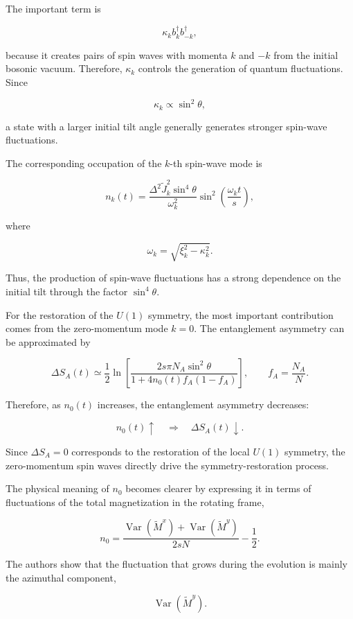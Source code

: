 \documentclass[10pt,a4paper,twocolumn]{article}
\begin{document}
		The important term is
		
		$$
		\kappa_k b_k^\dagger b_{-k}^\dagger,
		$$
		
		because it creates pairs of spin waves with momenta \(k\) and \(-k\) from the initial bosonic vacuum. Therefore, \(\kappa_k\) controls the generation of quantum fluctuations. Since
		
		$$
		\kappa_k\propto\sin^2\theta,
		$$
		
		a state with a larger initial tilt angle generally generates stronger spin-wave fluctuations. 
		
		The corresponding occupation of the \(k\)-th spin-wave mode is
		
		$$
		n_k(t)
		=
		\frac{\Delta^2\tilde J_k^2\sin^4\theta}{\omega_k^2}
		\sin^2\left(\frac{\omega_k t}{s}\right),
		$$
		
		where
		
		$$
		\omega_k=\sqrt{\xi_k^2-\kappa_k^2}.
		$$
		
		Thus, the production of spin-wave fluctuations has a strong dependence on the initial tilt through the factor \(\sin^4\theta\). 
		
		For the restoration of the \(U(1)\) symmetry, the most important contribution comes from the zero-momentum mode \(k=0\). The entanglement asymmetry can be approximated by
		
		$$
		\Delta S_A(t)
		\simeq
		\frac12
		\ln
		\left[
		\frac{
			2s\pi N_A\sin^2\theta
		}{
			1+4n_0(t)f_A(1-f_A)
		}
		\right],
		\qquad
		f_A=\frac{N_A}{N}.
		$$
		
		Therefore, as \(n_0(t)\) increases, the entanglement asymmetry decreases:
		
		$$
		n_0(t)\uparrow
		\quad\Rightarrow\quad
		\Delta S_A(t)\downarrow.
		$$
		
		Since \(\Delta S_A=0\) corresponds to the restoration of the local \(U(1)\) symmetry, the zero-momentum spin waves directly drive the symmetry-restoration process. 
		
		The physical meaning of \(n_0\) becomes clearer by expressing it in terms of fluctuations of the total magnetization in the rotating frame,
		
		$$
		n_0=
		\frac{
			\operatorname{Var}(\tilde M^x)
			+
			\operatorname{Var}(\tilde M^y)
		}{2sN}
		-\frac12 .
		$$
		
		The authors show that the fluctuation that grows during the evolution is mainly the azimuthal component,
		
		$$
		\operatorname{Var}(\tilde M^y).
		$$
		
\end{document}
